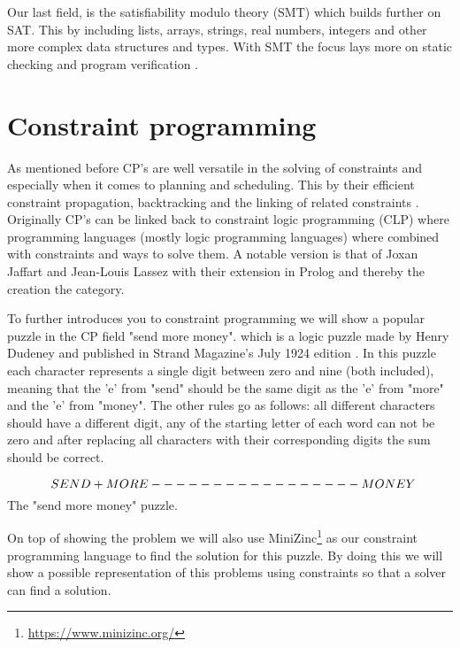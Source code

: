 Our last field, is the satisfiability modulo theory (SMT) which builds further on SAT. This by including lists, arrays, strings, real numbers, integers and other more complex data structures and types. With SMT the focus lays more on static checking and program verification \cite{56bardin2019bringing, 54moura2008z3}.


\section{Constraint programming}
\label{CS:CP}
As mentioned before CP's are well versatile in the solving of constraints and especially when it comes to planning and scheduling. This by their efficient constraint propagation, backtracking and the linking of related constraints \cite{66WikiCP}. Originally CP's can be linked back to constraint logic programming (CLP) where programming languages (mostly logic programming languages) where combined with constraints and ways to solve them. A notable version is that of Joxan Jaffart and Jean-Louis Lassez \cite{65jaffar1987constraint, 66WikiCP} with their extension in Prolog and thereby the creation the category.

To further introduces you to constraint programming we will show a popular puzzle in the CP field "send more money". which is a logic puzzle made by Henry Dudeney and published in Strand Magazine's July 1924 edition \cite{sendMoreMoney}.
In this puzzle each character represents a single digit between zero and nine (both included), meaning that the 'e' from "send" should be the same digit as the 'e' from "more" and the 'e' from "money". The other rules go as follows: all different characters should have a different digit, any of the starting letter of each word can not be zero and after replacing all characters with their corresponding digits the sum should be correct. 
\begin{center}
	\[$$
	\; \; S E N D\\
	+ M O R E\\
	-----------------\\
	M O N E Y
	$$\] The "send more money" puzzle.
\end{center}
On top of showing the problem we will also use MiniZinc\footnote{\url{https://www.minizinc.org/}} as our constraint programming language to find the solution for this puzzle. By doing this we will show a possible representation of this problems using constraints so that a solver can find a solution.

